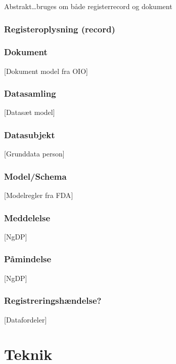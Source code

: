 Abstrakt\ldots{}bruges om både registerrecord og dokument

\subsubsection{Registeroplysning
(record)}\label{registeroplysning-record}

\subsubsection{Dokument}\label{dokument}

{[}Dokument model fra OIO{]}

\subsubsection{Datasamling}\label{datasamling}

{[}Datasæt model{]}

\subsubsection{Datasubjekt}\label{datasubjekt}

{[}Grunddata person{]}

\subsubsection{Model/Schema}\label{modelschema}

{[}Modelregler fra FDA{]}

\subsubsection{Meddelelse}\label{meddelelse}

{[}NgDP{]}

\subsubsection{Påmindelse}\label{puxe5mindelse}

{[}NgDP{]}

\subsubsection{Registreringshændelse?}\label{registreringshuxe6ndelse}

{[}Datafordeler{]}

\section{Teknik}\label{teknik}


